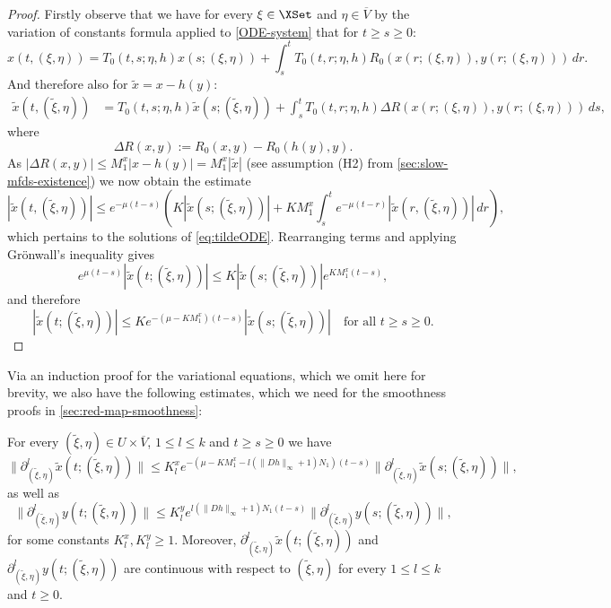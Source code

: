 \documentclass[a4paper]{siamart190516}
\begin{document}
\begin{proof}
Firstly observe that we have for every $\xi \in \XSet$ and $\eta \in \overline{V}$ by
the variation of constants formula applied to \eqref{ODE-system} that for $t \geq s \geq 0$:
\[
x(t,(\xi,\eta)) = T_0(t,s; \eta, h) x(s; (\xi,\eta)) + \int_s^t T_0(t,r; \eta, h) R_0(x(r; (\xi,\eta)),y(r;(\xi,\eta))) \, dr.
\]
And therefore also for $\tilde{x} = x - h(y)$:
\begin{align*}
\tilde{x}(t,(\tilde{\xi},\eta)) &= T_0(t,s; \eta, h) \tilde{x}(s; (\tilde{\xi},\eta)) + \int_s^t T_0(t,r; \eta, h) \Delta R (x(r; (\xi,\eta)),y(r;(\xi,\eta))) \, ds,
\end{align*}
where
\[
\Delta R (x,y) :=  R_0(x,y) - R_0(h(y), y).
\]
As $|\Delta R (x,y)| \leq M^x_1 |x - h(y)| = M^x_1 |\tilde{x}|$ (see assumption (H2) from \cref{sec:slow-mfds-existence}) we now obtain the estimate
\[
|\tilde{x}(t,(\tilde{\xi},\eta)) | \leq e^{-\mu (t-s)} \left( K |\tilde{x}(s; (\tilde{\xi},\eta))| + K M^x_1 \int_s^t e^{-\mu (t-r)} |\tilde{x}(r,(\tilde{\xi},\eta)) |  \, dr   \right),
\]
which pertains to the solutions of \cref{eq:tildeODE}. Rearranging terms and applying Gr\"onwall's inequality gives
\[
e^{\mu (t-s)} |\tilde{x}(t;(\tilde{\xi},\eta)) | \leq K |\tilde{x}(s; (\tilde{\xi},\eta))|  e^{K M^x_1 (t-s)},
\]
and therefore 
\[
 |\tilde{x}(t;(\tilde{\xi},\eta)) | \leq K e^{-(\mu - K M^x_1) (t-s)} |\tilde{x}(s; (\tilde{\xi},\eta))|  \quad \text{for all } t \geq s \geq 0.
\]
\end{proof}

Via an induction proof for the variational equations, which we omit here for brevity, we also have the following
estimates, which we need for the smoothness proofs in \cref{sec:red-map-smoothness}:
\begin{lemma}\label{lem:ODE-system-derivative-bounds}
For every $(\tilde{\xi},\eta) \in U \times \overline{V}$, $1 \leq l \leq k$ and $t \geq s \geq 0$ we have
\[
	 \| \partial^l_{(\tilde{\xi},\eta)} \tilde{x}(t;(\tilde{\xi},\eta)) \| \leq K^x_l e^{-(\mu - K M^x_1 - l(\|Dh\|_{\infty} + 1) N_1) (t-s)} \| \partial^l_{(\tilde{\xi},\eta)} \tilde{x}(s;(\tilde{\xi},\eta)) \|,
\]
as well as
\[
	\| \partial^l_{(\tilde{\xi},\eta)} y(t;(\tilde{\xi},\eta)) \| \leq K^y_l e^{l (\|Dh\|_{\infty} + 1) N_1 (t-s)} \| \partial^l_{(\tilde{\xi},\eta)} y(s;(\tilde{\xi},\eta)) \|,
\]
for some constants $K^x_l, K^y_l \geq 1$. Moreover, $\partial^l_{(\tilde{\xi},\eta)} \tilde{x}(t;(\tilde{\xi},\eta))$ and $\partial^l_{(\tilde{\xi},\eta)} y(t;(\tilde{\xi},\eta))$ are continuous with respect to $(\tilde{\xi},\eta)$ for every $1 \leq l \leq k$ and $t \geq 0$. 
\end{lemma}
\end{document}
